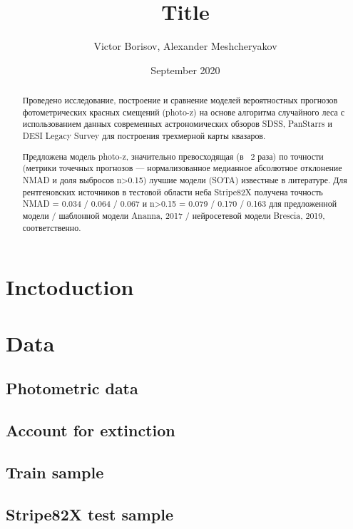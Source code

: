 \documentclass[fleqn,usenatbib]{mnras}
\title[ShortTitle]{Title}
\author[Borisov et al.]{Victor Borisov, Alexander Meshcheryakov %
}
\date{September 2020}
\begin{document}
\maketitle
\begin{abstract}
Проведено исследование, построение и сравнение моделей вероятностных прогнозов фотометрических красных смещений (photo-z) на основе алгоритма случайного леса  с использованием данных современных астрономических обзоров SDSS, PanStarrs и DESI Legacy Survey для построения трехмерной карты квазаров.

Предложена модель photo-z, значительно превосходящая (в ~2 раза) по точности (метрики точечных прогнозов — нормализованное медианное абсолютное отклонение NMAD и доля выбросов n>0.15) лучшие модели (SOTA) известные в литературе. Для рентгеновских источников в тестовой области неба Stripe82X получена точность NMAD = 0.034 / 0.064 / 0.067 и n>0.15 = 0.079 / 0.170 / 0.163 для предложенной модели / шаблонной модели Ananna, 2017 / нейросетевой модели Brescia, 2019, соответственно.
\end{abstract}

% 
% 
% 
% 
% 
% 
% 
% 
% 

\section{Inctoduction}


\section{Data}
\subsection{Photometric data}
\subsection{Account for extinction}
\subsection{Train sample}
\subsection{Stripe82X test sample}
\end{document}
